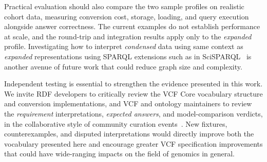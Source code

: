 Practical evaluation should also compare the two sample profiles on realistic cohort data, measuring conversion cost, storage, loading, and query execution alongside answer correctness.
The current examples do not establish performance at scale, and the round-trip and integration results apply only to the \textit{expanded} profile.
Investigating how to interpret \textit{condensed} data using same context as \textit{expanded} representations using SPARQL extensions such as in SciSPARQL~\cite{andrejev2012scisparql} is another avenue of future work that could reduce graph size and complexity.

Independent testing is essential to strengthen the evidence presented in this work.
We invite RDF developers to critically review the VCF Core vocabulary structure and conversion implementations, and VCF and ontology maintainers to review the \emph{requirement} interpretations, \emph{expected answers}, and model-comparison verdicts, in the collaborative style of community curation events~\cite{katayama2019biohackathon,bh25}.
New fixtures, counterexamples, and disputed interpretations would directly improve both the vocabulary presented here and encourage greater VCF specification improvements that could have wide-ranging impacts on the field of genomics in general.
